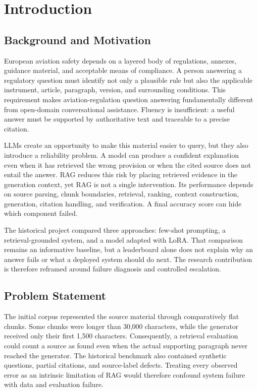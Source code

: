 \chapter{Introduction}
\label{chap:introduction}

\section{Background and Motivation}

European aviation safety depends on a layered body of regulations, annexes, guidance material, and acceptable means of compliance. A person answering a regulatory question must identify not only a plausible rule but also the applicable instrument, article, paragraph, version, and surrounding conditions. This requirement makes aviation-regulation question answering fundamentally different from open-domain conversational assistance. Fluency is insufficient: a useful answer must be supported by authoritative text and traceable to a precise citation.

\acp{LLM} create an opportunity to make this material easier to query, but they also introduce a reliability problem. A model can produce a confident explanation even when it has retrieved the wrong provision or when the cited source does not entail the answer. \ac{RAG} reduces this risk by placing retrieved evidence in the generation context, yet RAG is not a single intervention. Its performance depends on source parsing, chunk boundaries, retrieval, ranking, context construction, generation, citation handling, and verification. A final accuracy score can hide which component failed.

The historical project compared three approaches: few-shot prompting, a retrieval-grounded system, and a model adapted with \ac{LoRA}. That comparison remains an informative baseline, but a leaderboard alone does not explain why an answer fails or what a deployed system should do next. The research contribution is therefore reframed around failure diagnosis and controlled escalation.

\section{Problem Statement}

The initial corpus represented the source material through comparatively flat chunks. Some chunks were longer than 30,000 characters, while the generator received only their first 1,500 characters. Consequently, a retrieval evaluation could count a source as found even when the actual supporting paragraph never reached the generator. The historical benchmark also contained synthetic questions, partial citations, and source-label defects. Treating every observed error as an intrinsic limitation of RAG would therefore confound system failure with data and evaluation failure.

